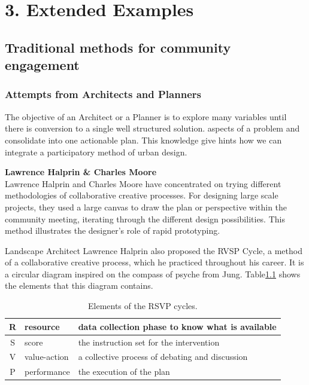 \chapter{3. Extended Examples}

\section{Traditional methods for community engagement}

\subsection{Attempts from Architects and Planners}

The objective of an Architect or a Planner is to explore many variables
until there is conversion to a single well structured solution.
aspects of a problem and consolidate into one actionable plan.
This knowledge give hints how we can integrate a participatory method
of urban design.

\textbf{Lawrence Halprin \& Charles Moore} \\
Lawrence Halprin and Charles Moore have concentrated on trying different methodologies of collaborative creative processes. For designing large scale projects, they used a large canvas to draw the plan or perspective within the community meeting, iterating through the different design possibilities. This method illustrates the designer's role of rapid prototyping.

Landscape Architect Lawrence Halprin also proposed the RVSP Cycle, a method of a collaborative creative process, which he practiced throughout his career. It is a circular diagram inspired on the compass of psyche from Jung. Table\ref{tab:rvsp} shows the elements that this diagram contains.

\begin{table}
  \centering
  \begin{tabular}{|c l | l |}
    \hline
    R & resource & data collection phase to know what is available \\ \hline
    S & score & the instruction set for the intervention \\ \hline
    V & value-action & a collective process of debating and discussion \\ \hline
    P & performance & the execution of the plan \\ \hline
  \end{tabular}
  \caption{Elements of the RSVP cycles.}
  \label{tab:rvsp}
\end{table}

